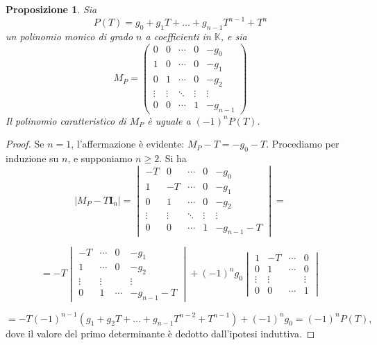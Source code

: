 \documentclass{article}
\theoremstyle{plain}
\newtheorem{prop}[thm]{Proposizione}
\theoremstyle{definition}
\theoremstyle{remark}
\begin{document}
\begin{bxthm}
\begin{prop}
Sia
\[
P(T) = g_0 + g_1 T + \dots + g_{n-1} T^{n-1} + T^n
\]
un polinomio monico di grado $n$ a coefficienti in $\mathbb{K}$, e sia
\[
M_P =
\begin{pmatrix}
0 & 0 & \cdots & 0 & -g_0 \\
1 & 0 & \cdots & 0 & -g_1 \\
0 & 1 & \cdots & 0 & -g_2 \\
\vdots & \vdots & \ddots & \vdots & \vdots \\
0 & 0 & \cdots & 1 & -g_{n-1}
\end{pmatrix}
\]
Il polinomio caratteristico di $M_P$ è uguale a $(-1)^n P(T)$.     
\end{prop}
\end{bxthm}
\begin{proof}
Se $n = 1$, l'affermazione è evidente: $M_P - T = -g_0 - T$. 
Procediamo per induzione su $n$, e supponiamo $n \geq 2$. Si ha
\[
|M_P - T \mathbf{I}_n| =
\begin{vmatrix}
-T & 0 & \cdots & 0 & -g_0 \\
1 & -T & \cdots & 0 & -g_1 \\
0 & 1 & \cdots & 0 & -g_2 \\
\vdots & \vdots & \ddots & \vdots & \vdots \\
0 & 0 & \cdots & 1 & -g_{n-1} - T
\end{vmatrix}
=
\]

\[
= -T 
\begin{vmatrix}
- T & \cdots & 0 &  -g_1 \\
1 & \cdots & 0 &  -g_2 \\
\vdots & \vdots &   & \vdots \\
0 & 1 & \cdots &  -g_{n-1}-T
\end{vmatrix}
+ (-1)^n g_0 
\begin{vmatrix}
1 & -T &  \cdots & 0 \\
0 & 1 &  \cdots & 0 \\
\vdots & \vdots &  & \vdots \\
0 & 0 &  \cdots & 1
\end{vmatrix}
\]

\[
= -T(-1)^{n-1}(g_1 + g_2 T + \dots + g_{n-1} T^{n-2} + T^{n-1}) + (-1)^n g_0 = (-1)^n P(T),
\]
dove il valore del primo determinante è dedotto dall'ipotesi induttiva.    
\end{proof}

\vspace{10pt}
\end{document}
